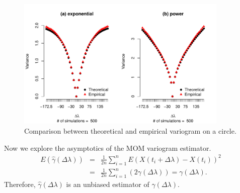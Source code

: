 \begin{figure}
	\centering
	\includegraphics[width=0.9\textwidth]{graphs/variogram_plot_500}
	\caption[Comparison Between Theoretical and Empirical Variogram on a Circle.]{Comparison between theoretical and empirical variogram on a circle.}
	\label{variogram_circle}
\end{figure}


Now we explore the asymptotics of the MOM variogram estimator.
\begin{eqnarray}
\nonumber
E(\hat{\gamma}(\Delta \lambda)) &=&\frac{1}{2n} \sum_{i = 1}^n E(X(t_i + \Delta \lambda) - X(t_i))^2 \\
&=& \frac{1}{2n} \sum_{i = 1}^n \left( 2\gamma(\Delta \lambda)\right) = \gamma(\Delta \lambda) \label{unbiased_variogram}.
\end{eqnarray}
Therefore, $\hat{\gamma}(\Delta \lambda)$ is an unbiased estimator of $\gamma(\Delta \lambda)$.\\

